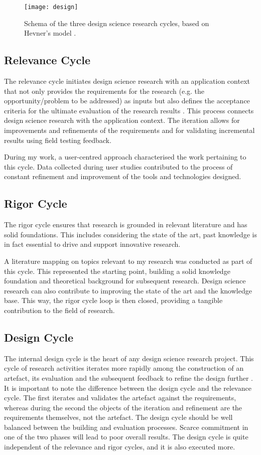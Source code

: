 \begin{figure}[ptb]
    \centering 
	\texttt{[image: design]}
	\caption{Schema of the three design science research cycles, based on Hevner's model \autocite*{hevner_three_2007}.}
	\label{fig:design-cycles}
\end{figure}


\subsection{Relevance Cycle}
The relevance cycle initiates design science research with an application context that not only provides the requirements for the research (e.g. the opportunity/problem to be addressed) as inputs but also defines the acceptance criteria for the ultimate evaluation of the research results \autocite{hevner_design_2010}.
This process connects design science research with the application context. The iteration allows for improvements and refinements of the requirements and for validating incremental results using field testing feedback.

During my work, a user-centred approach characterised the work pertaining to this cycle. Data collected during user studies contributed to the process of constant refinement and improvement of the tools and technologies designed.

\subsection{Rigor Cycle}
The rigor cycle ensures that research is grounded in relevant literature and has solid foundations. This includes considering the state of the art, past knowledge is in fact essential to drive and support innovative research.

A literature mapping on topics relevant to my research was conducted as part of this cycle. This represented the starting point, building a solid knowledge foundation and theoretical background for subsequent research.
Design science research can also contribute to improving the state of the art and the knowledge base. This way, the rigor cycle loop is then closed, providing a tangible contribution to the field of research.

\subsection{Design Cycle}
The internal design cycle is the heart of any design science research project. This cycle of research activities iterates more rapidly among the construction of an artefact, its evaluation and the subsequent feedback to refine the design further \autocite{hevner_design_2010}.
It is important to note the difference between the design cycle and the relevance cycle. The first iterates and validates the artefact against the requirements, whereas during the second the objects of the iteration and refinement are the requirements themselves, not the artefact.
The design cycle should be well balanced between the building and evaluation processes. Scarce commitment in one of the two phases will lead to poor overall results.
The design cycle is quite independent of the relevance and rigor cycles, and it is also executed more.


